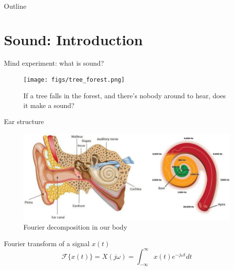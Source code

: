 
\usepackage{tikz}
\usetikzlibrary{arrows,shapes,positioning,shadows,trees}

\begin{frame}
\titlepage
\end{frame}
\begin{frame}{Outline}
	\tableofcontents
\end{frame}
\section{Sound: Introduction}
\begin{frame}{Mind experiment: what is sound?}
		\begin{figure}
			\centering
			\texttt{[image: figs/tree\_forest.png]}
			\caption{If a tree falls in the forest, and there’s nobody around to hear, does it make a sound?}
		\end{figure}
\end{frame}
\begin{frame}{Ear structure}
	\begin{figure}
		\centering
		\includegraphics[width=0.99\linewidth]{figs/ear_structure.png}
		\caption{Fourier decomposition in our body}
	\end{figure}
	Fourier transform of a signal $x(t)$
	$$
	\mathcal{F}\{x(t)\}=X(j \omega)=\int_{-\infty}^{\infty} x(t) e^{-j \omega t} d t
	$$
\end{frame}
